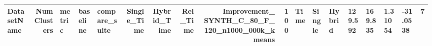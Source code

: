 \begin{tabular}{lrlllrrrrr}
\toprule
DatasetName & NumClusters & metric & baseline & compare_suite & Single_Time & Hybrid_Time & Rel_Time & Improvement_%
\midrule
SYNTH_C_80_F_120_n1000_000k_kmeans & 100 & Time & Single & Hybrid & 129.592 & 169.835 & 1.31054 & -31.0538 & 7 \\
\bottomrule
\end{tabular}
